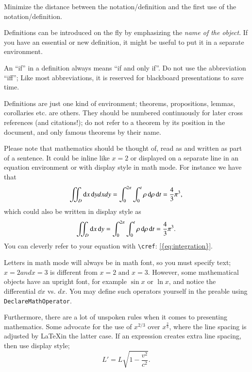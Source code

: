 \documentclass[UKenglish,bachelor]{uiomaster}  %
\begin{document}
Minimize the distance between the notation/definition and the first use of the notation/definition. 

Definitions can be introduced on the fly by emphasizing the \emph{name of the object}. If you have an essential or new definition, it might be useful to put it in a separate environment.

\begin{definition}
An \enquote{if} in a definition always means \enquote{if and only if}. Do not use the abbreviation \enquote{iff}; Like most abbreviations, it is reserved for blackboard presentations to save time.
\end{definition}

Definitions are just one kind of environment; theorems, propositions, lemmas, corollaries etc. are others. They should be numbered continuously for later cross references (and citations!); do not refer to a theorem by its position in the document, and only famous theorems by their name.

Please note that mathematics should be thought of, read as and written as part of a sentence. It could be inline like $x=2$ or displayed on a separate line in an equation environment or with display style in math mode. For instance we have that
\begin{equation}
    \iint_D \dd x \mathop{}\!\mathrm{d} y dxdy
    =
    \int_0^{2\pi} \int_0^t \rho \mathop{}\!\mathrm{d} \rho \mathop{}\!\mathrm{d} t
    =
    \frac{4}{3} \pi^3,
    \label{eq:integration}
\end{equation}
which could also be written in display style as 
\[\iint_D \dd x \mathop{}\!\mathrm{d} y
    =
    \int_0^{2\pi} \int_0^t \rho \mathop{}\!\mathrm{d} \rho \mathop{}\!\mathrm{d} t
    =
    \frac{4}{3} \pi^3.\]
You can cleverly refer to your equation with \texttt{\textbackslash cref}: \cref{{eq:integration}}. 

Letters in math mode will always be in math font, so you must specify text; $x=2 and x=3$ is different from $x=2 \text{ and } x=3$. However, some mathematical objects have an upright font, for example $\sin{x}$ or $\ln{x}$, and notice the differential $\dd{x}$ vs. $dx$. You may define such operators yourself in the preable using \texttt{DeclareMathOperator}.

Furthermore, there are a lot of unspoken rules when it comes to presenting mathematics. Some advocate for the use of $x^{2/3}$ over $x^{\tfrac{2}{3}}$, where the line spacing is adjusted by \LaTeX in the latter case. If an expression creates extra line spacing, then use display style;
\begin{equation}
  L' = {L}{\sqrt{1-\frac{v^2}{c^2}}}.
 \end{equation}
\end{document}
